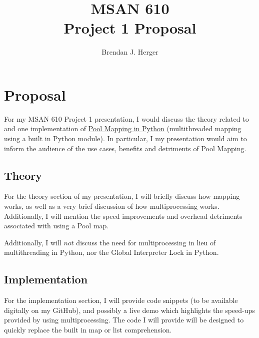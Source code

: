 \documentclass[11pt, oneside]{article}   	%
\title{MSAN 610 \\Project 1 Proposal}
\author{Brendan J. Herger}
\begin{document}
\maketitle
\section{Proposal}
For my MSAN 610 Project 1 presentation, I would discuss the theory related to and one implementation of \href{https://docs.python.org/2/library/multiprocessing.html#multiprocessing.pool.multiprocessing.Pool.map}{Pool Mapping in Python} (multithreaded mapping using a built in Python module). In particular, I my presentation would aim to inform the audience of the use cases, benefits and detriments of Pool Mapping.

\subsection{Theory}
For the theory section of my presentation, I will briefly discuss how mapping works, as well as a very brief discussion of how multiprocessing works. Additionally, I will mention the speed improvements and overhead detriments associated with using a Pool map. 

Additionally, I will $not$ discuss the need for multiprocessing in lieu of multithreading in Python, nor the Global Interpreter Lock in Python.

\subsection{Implementation}
For the implementation section, I will provide code snippets (to be available digitally on my GitHub), and possibly a live demo which highlights the speed-ups provided by using multiprocessing. The code I will provide will be designed to quickly replace the built in map or list comprehension.


\end{document}
